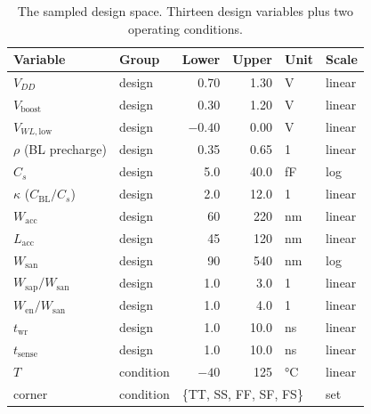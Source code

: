 \documentclass[11pt,a4paper]{article}
\newcommand{\Cs}{C_{s}}
\newcommand{\Cbl}{C_{\mathrm{BL}}}
\begin{document}
\begin{table}[!ht]
\centering
\caption{The sampled design space. Thirteen design variables plus two operating
conditions.}
\label{tab:designspace}
\footnotesize
\begin{tabular}{@{}llrrll@{}}
\toprule
\textbf{Variable} & \textbf{Group} & \textbf{Lower} & \textbf{Upper} &
\textbf{Unit} & \textbf{Scale} \\
\midrule
$V_{DD}$              & design      & 0.70   & 1.30   & V   & linear \\
$V_{\mathrm{boost}}$  & design      & 0.30   & 1.20   & V   & linear \\
$V_{WL,\mathrm{low}}$ & design      & $-0.40$& 0.00   & V   & linear \\
$\rho$ (BL precharge) & design      & 0.35   & 0.65   & 1   & linear \\
$\Cs$                 & design      & 5.0    & 40.0   & fF  & log \\
$\kappa$ ($\Cbl/\Cs$) & design      & 2.0    & 12.0   & 1   & linear \\
$W_{\mathrm{acc}}$    & design      & 60     & 220    & nm  & linear \\
$L_{\mathrm{acc}}$    & design      & 45     & 120    & nm  & linear \\
$W_{\mathrm{san}}$    & design      & 90     & 540    & nm  & log \\
$W_{\mathrm{sap}}/W_{\mathrm{san}}$ & design & 1.0 & 3.0 & 1 & linear \\
$W_{\mathrm{en}}/W_{\mathrm{san}}$  & design & 1.0 & 4.0 & 1 & linear \\
$t_{\mathrm{wr}}$     & design      & 1.0    & 10.0   & ns  & linear \\
$t_{\mathrm{sense}}$  & design      & 1.0    & 10.0   & ns  & linear \\
$T$                   & condition   & $-40$  & 125    & \si{\celsius} & linear \\
corner                & condition   & \multicolumn{3}{l}{\{TT, SS, FF, SF, FS\}} & set \\
\bottomrule
\end{tabular}
\end{table}
\end{document}
